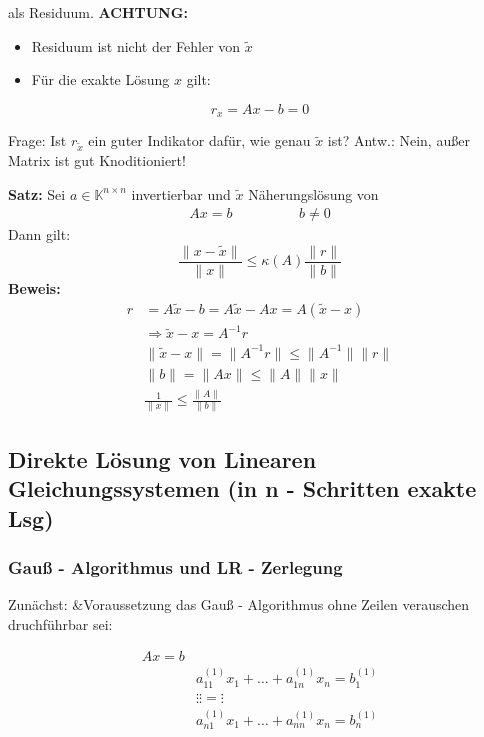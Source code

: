 als Residuum.
\textbf{ACHTUNG:}
\begin{itemize}
  \item{Residuum ist nicht der Fehler von $\widetilde{x}$}
	\item{Für die exakte Lösung $x$ gilt:}
\end{itemize}
\begin{equation*}
r_x = Ax - b = 0
\end{equation*}

Frage: Ist $r_{\widetilde{x}}$ ein guter Indikator dafür, wie genau $\widetilde{x}$ ist?
Antw.: Nein, außer Matrix ist gut Knoditioniert!

\textbf{Satz:}
Sei $a \in \mathbb{K}^{n \times n}$ invertierbar und $\widetilde{x}$ Näherungslösung von
\begin{equation*}
\begin{aligned}
Ax = b \hspace{2cm} b \neq 0
\end{aligned}
\end{equation*}
Dann gilt:
\begin{equation*}
\frac{\|x - \widetilde{x}\|}{\|x\|} \leq \kappa\left(A\right) \frac{\|r\|}{\|b\|}
\end{equation*}
\textbf{Beweis:}
\begin{equation*}
\begin{aligned}
r &= A\widetilde{x} - b = A\widetilde{x} - Ax = A\left(\widetilde{x} - x\right) \\
&\Rightarrow \widetilde{x} - x = A^{-1}r \\
&\|\widetilde{x} - x\| = \|A^{-1}r\| \leq \|A^{-1}\|\|r\| \\
&\|b\| = \|Ax\| \leq \|A\|\|x\| \\
&\frac{1}{\|x\|} \leq \frac{\|A\|}{\|b\|}
\end{aligned}
\end{equation*}

\subsection{Direkte Lösung von Linearen Gleichungssystemen (in n - Schritten exakte Lsg)}
\subsubsection{Gauß - Algorithmus und LR - Zerlegung}
Zunächst: &Voraussetzung das Gauß - Algorithmus ohne Zeilen verauschen druchführbar sei:

\begin{equation*}
  \begin{aligned}
    Ax = b \\
    &a_{11}^{\left(1\right)}x_1 + \ldots + a_{1n}^{\left(1\right)}x_n = b_1^{\left(1\right)}  \\
    &\vdots                               \vdots                     = \vdots  \\
    &a_{n1}^{(1)}x_1 + \ldots + a_{nn}^{(1)}x_n = b_n^{(1)}  \\
  \end{aligned}
\end{equation*}

